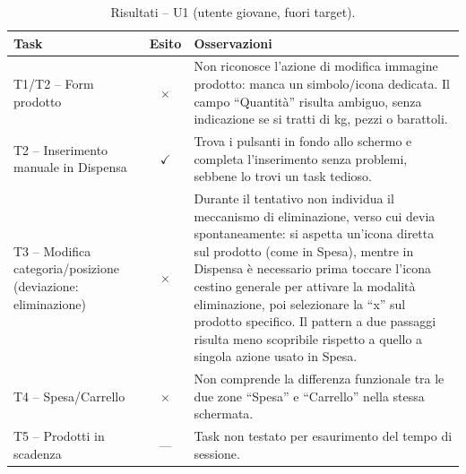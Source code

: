 \documentclass[11pt,a4paper]{article}
\begin{document}
\begin{table}[H]
\centering
\small
\renewcommand{\arraystretch}{1.3}
\begin{tabularx}{\textwidth}{>{\raggedright\arraybackslash}p{3.2cm} c >{\raggedright\arraybackslash}X}
\toprule
\textbf{Task} & \textbf{Esito} & \textbf{Osservazioni} \\
\midrule
T1/T2 -- Form prodotto & {\color{redCons}$\times$} & Non riconosce l'azione di modifica immagine prodotto: manca un simbolo/icona dedicata. Il campo ``Quantità'' risulta ambiguo, senza indicazione se si tratti di kg, pezzi o barattoli. \\ \addlinespace[0.4em]
T2 -- Inserimento manuale in Dispensa & {\color{greenPro}$\checkmark$} & Trova i pulsanti in fondo allo schermo e completa l'inserimento senza problemi, sebbene lo trovi un task tedioso. \\ \addlinespace[0.4em]
T3 -- Modifica categoria/posizione (deviazione: eliminazione) & {\color{redCons}$\times$} & Durante il tentativo non individua il meccanismo di eliminazione, verso cui devia spontaneamente: si aspetta un'icona diretta sul prodotto (come in Spesa), mentre in Dispensa è necessario prima toccare l'icona cestino generale per attivare la modalità eliminazione, poi selezionare la ``x'' sul prodotto specifico. Il pattern a due passaggi risulta meno scopribile rispetto a quello a singola azione usato in Spesa. \\ \addlinespace[0.4em]
T4 -- Spesa/Carrello & {\color{redCons}$\times$} & Non comprende la differenza funzionale tra le due zone ``Spesa'' e ``Carrello'' nella stessa schermata. \\ \addlinespace[0.4em]
T5 -- Prodotti in scadenza & --- & Task non testato per esaurimento del tempo di sessione. \\
\bottomrule
\end{tabularx}
\caption{Risultati -- U1 (utente giovane, fuori target).}
\label{tab:eval_u1}
\end{table}
\end{document}
